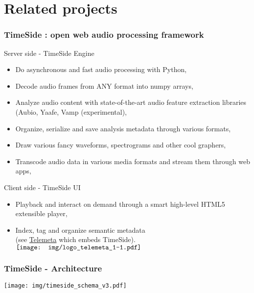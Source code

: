 \documentclass[10pt, final, hyperref, table]{beamer}
\begin{document}
\section{Related projects}
\frame{\tableofcontents[currentsection]}

\begin{frame}
 \frametitle{TimeSide : open web audio processing framework}%
\begin{block}{Server side - TimeSide Engine}
  \begin{itemize}
  \item \alert{Do} asynchronous and fast audio processing with Python,
  \item \alert{Decode} audio frames from ANY format into numpy arrays,
  \item \alert{Analyze} audio content with state-of-the-art audio feature extraction libraries (Aubio, Yaafe, Vamp (experimental),
  \item  \alert{Organize}, serialize and save analysis metadata through various formats,
  \item  \alert{Draw} various fancy waveforms, spectrograms and other cool graphers,
  \item  \alert{Transcode} audio data in various media formats and stream them through web apps,
  \end{itemize}
 
\end{block}
\begin{block}{Client side - TimeSide UI}
  \begin{itemize}
  \item   \alert{Playback} and  \alert{interact} on demand through a smart high-level HTML5 extensible player,
  \item   \alert{Index},  \alert{tag} and  \alert{organize semantic metadata} \\
(see \href{http://telemeta.org/}{Telemeta} which embeds TimeSide). 
\hfill $\vcenter{\hbox{\texttt{[image: img/logo\_telemeta\_1-1.pdf]}}}$
  \end{itemize}
\end{block}
\end{frame}

\begin{frame}
  \frametitle{TimeSide - Architecture}
  \begin{center}
    \texttt{[image: img/timeside\_schema\_v3.pdf]}
  \end{center}
\end{frame}
\end{document}
